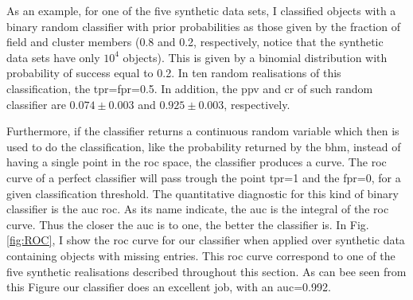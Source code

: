 As an example, for one of the five synthetic data sets,  I classified objects with a binary random classifier with prior probabilities as those given by the fraction of field and cluster members (0.8 and 0.2, respectively, notice that the synthetic data sets have only $10^4$ objects). This is given by a binomial distribution with probability of success equal to 0.2. In ten random realisations of this classification, the \gls{tpr}=\gls{fpr}=0.5. In addition, the \gls{ppv} and \gls{cr} of such random classifier are $0.074\pm 0.003$ and $0.925\pm0.003$, respectively.

Furthermore, if the classifier returns a continuous random variable which then is used to do the classification, like the probability returned by the \gls{bhm}, instead of having a single point in the \gls{roc} space, the classifier produces a curve. The \gls{roc} curve of a perfect classifier will pass trough the point \gls{tpr}=1 and the \gls{fpr}=0, for a given classification threshold. The quantitative diagnostic for this kind of binary classifier is the \gls{auc} \gls{roc}. As its name indicate, the \gls{auc} is the integral of the \gls{roc} curve. Thus the closer the \gls{auc} is to one, the better the classifier is. In Fig. \ref{fig:ROC}, I show the \gls{roc} curve for our classifier when applied over synthetic data containing objects with missing entries. This \gls{roc} curve correspond to one of the five synthetic realisations described throughout this section. As can bee seen from this Figure our classifier does an excellent job, with an \gls{auc}=0.992.

